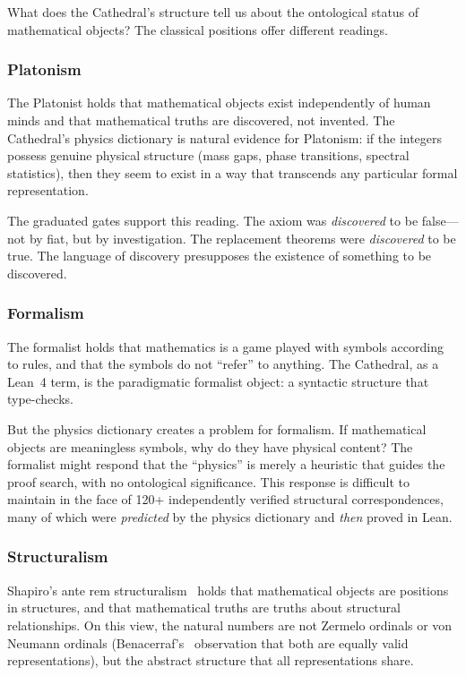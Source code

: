 What does the Cathedral's structure tell us about the ontological
status of mathematical objects? The classical positions offer
different readings.

\subsubsection{Platonism}

The Platonist holds that mathematical objects exist independently
of human minds and that mathematical truths are discovered, not
invented. The Cathedral's physics dictionary is natural evidence
for Platonism: if the integers possess genuine physical structure
(mass gaps, phase transitions, spectral statistics), then they
seem to exist in a way that transcends any particular formal
representation.

The graduated gates support this reading. The axiom
 was \emph{discovered} to be
false---not by fiat, but by investigation. The replacement theorems
were \emph{discovered} to be true. The language of discovery
presupposes the existence of something to be discovered.

\subsubsection{Formalism}

The formalist holds that mathematics is a game played with symbols
according to rules, and that the symbols do not ``refer'' to
anything. The Cathedral, as a Lean~4 term, is the paradigmatic
formalist object: a syntactic structure that type-checks.

But the physics dictionary creates a problem for formalism. If
mathematical objects are meaningless symbols, why do they have
physical content? The formalist might respond that the ``physics''
is merely a heuristic that guides the proof search, with no
ontological significance. This response is difficult to maintain
in the face of 120+ independently verified structural
correspondences, many of which were \emph{predicted} by the
physics dictionary and \emph{then} proved in Lean.

\subsubsection{Structuralism}

Shapiro's ante rem structuralism~\cite{shapiro1997} holds that
mathematical objects are positions in structures, and that
mathematical truths are truths about structural relationships.
On this view, the natural numbers are not Zermelo ordinals or
von Neumann ordinals (Benacerraf's~\cite{benacerraf1965}
observation that both are equally valid representations), but
the abstract structure that all representations share.

